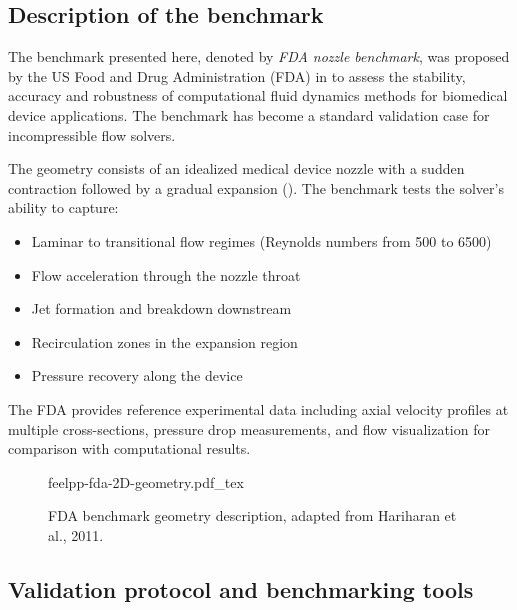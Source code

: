 \subsection{Description of the benchmark}

The benchmark presented here, denoted by \emph{FDA nozzle benchmark}, was proposed by the US Food and Drug Administration (FDA) in \cite{hariharan_multilaboratory_2011} to assess the stability, accuracy and robustness of computational fluid dynamics methods for biomedical device applications. The benchmark has become a standard validation case for incompressible flow solvers.

The geometry consists of an idealized medical device nozzle with a sudden contraction followed by a gradual expansion (). The benchmark tests the solver's ability to capture:
\begin{itemize}
\item Laminar to transitional flow regimes (Reynolds numbers from 500 to 6500)
\item Flow acceleration through the nozzle throat
\item Jet formation and breakdown downstream
\item Recirculation zones in the expansion region
\item Pressure recovery along the device
\end{itemize}

The FDA provides reference experimental data including axial velocity profiles at multiple cross-sections, pressure drop measurements, and flow visualization for comparison with computational results.

\begin{figure}[!ht]
  \centering
  \def\svgwidth{\textwidth}
  {feelpp-fda-2D-geometry.pdf_tex}
  \caption{FDA benchmark geometry description, adapted from Hariharan et al., 2011.}
  \label{fig:spec:app-feelpp-discr-2:fda:geometry}
\end{figure}



\subsection{Validation protocol and benchmarking tools}


